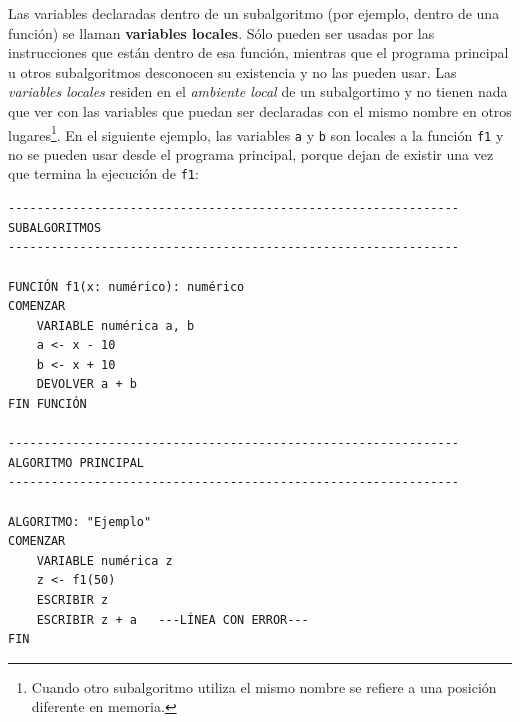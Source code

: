 \documentclass[
]{book}
\begin{document}
Las variables declaradas dentro de un subalgoritmo (por ejemplo, dentro de una función) se llaman \textbf{variables locales}. Sólo pueden ser usadas por las instrucciones que están dentro de esa función, mientras que el programa principal u otros subalgoritmos desconocen su existencia y no las pueden usar. Las \emph{variables locales} residen en el \emph{ambiente local} de un subalgortimo y no tienen nada que ver con las variables que puedan ser declaradas con el mismo nombre en otros lugares\footnote{Cuando otro subalgoritmo utiliza el mismo nombre se refiere a una posición diferente en memoria.}. En el siguiente ejemplo, las variables \texttt{a} y \texttt{b} son locales a la función \texttt{f1} y no se pueden usar desde el programa principal, porque dejan de existir una vez que termina la ejecución de \texttt{f1}:

\begin{verbatim}
---------------------------------------------------------------
SUBALGORITMOS
---------------------------------------------------------------

FUNCIÓN f1(x: numérico): numérico
COMENZAR
    VARIABLE numérica a, b
    a <- x - 10
    b <- x + 10
    DEVOLVER a + b
FIN FUNCIÓN

---------------------------------------------------------------
ALGORITMO PRINCIPAL
---------------------------------------------------------------

ALGORITMO: "Ejemplo"
COMENZAR
    VARIABLE numérica z
    z <- f1(50)
    ESCRIBIR z
    ESCRIBIR z + a   ---LÍNEA CON ERROR---
FIN
\end{verbatim}
\end{document}
